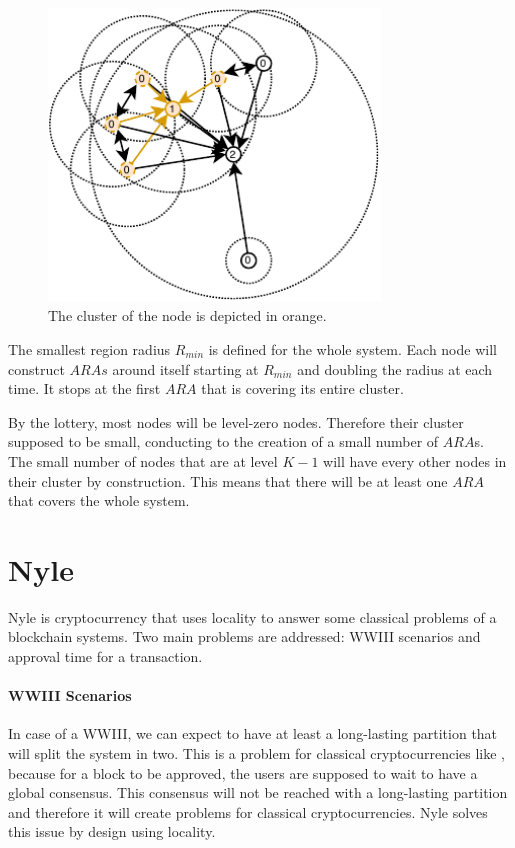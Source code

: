 \documentclass[a4paper,11pt,oneside]{report}
\begin{document}
\begin{figure}[!h] 
\centering
\includegraphics[width=250pt]{figures/ClusterBunch-Cluster}
\caption{ The cluster of the node is depicted in orange. }
\label{fig:ClusterBunch-Cluster}
\end{figure}

The smallest region radius $R_{min}$ is defined for the whole system. Each node
will construct $ARAs$ around itself starting at $R_{min}$ and doubling the
radius at each time. It stops at the first $ARA$ that is covering its entire
cluster. 

By the lottery, most nodes will be level-zero nodes. Therefore their cluster
supposed to be small, conducting to the creation of a small number of $ARA$s.
The small number of nodes that are at level $K-1$ will have every other nodes
in their cluster by construction. This means that there will be at least one
$ARA$ that covers the whole system. 

\section{Nyle}

Nyle is cryptocurrency that uses locality to answer some classical problems of
a blockchain systems. Two main problems are addressed: WWIII scenarios and
approval time for a transaction.
 
\paragraph{WWIII Scenarios} \label{WWIII} In case of a WWIII, we can expect to have
at least a long-lasting partition that will split the system in two. This is a
problem for classical cryptocurrencies like \cite{Nakamoto2009}, because for a
block to be approved, the users are supposed to wait to have a global
consensus. This consensus will not be reached with a long-lasting partition and
therefore it will create problems for classical cryptocurrencies. Nyle solves
this issue by design using locality.
\end{document}
